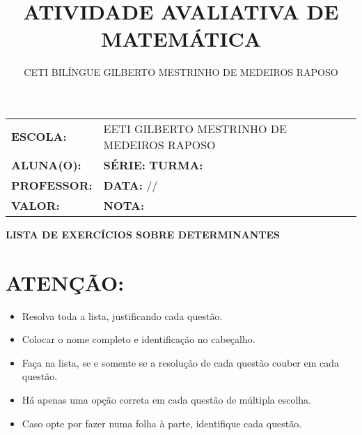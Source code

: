 \documentclass{article}
\title{ATIVIDADE AVALIATIVA DE MATEMÁTICA}
\author{CETI BILÍNGUE GILBERTO MESTRINHO DE MEDEIROS RAPOSO}
\date{}
\begin{document}
	\Large
	\vspace{1cm}
	\begin{center}
		\begin{tabular}{|l l|}
			\hline
			\textbf{ESCOLA:} & EETI GILBERTO MESTRINHO DE MEDEIROS RAPOSO \\
			\textbf{ALUNA(O):} & \underline{\hspace{8cm}} \textbf{SÉRIE:} \underline{\hspace{2cm}} \textbf{TURMA:} \underline{\hspace{2cm}} \\
			\textbf{PROFESSOR:} & \underline{\hspace{8cm}} \textbf{DATA:} \underline{\hspace{1.66cm}}/\underline{\hspace{2cm}}/\underline{\hspace{2cm}} \\
			\textbf{VALOR:} & \underline{\hspace{4cm}} \textbf{NOTA:} \underline{\hspace{2cm}} \\
			\hline
		\end{tabular}
	\end{center}
	\vspace{1cm}
	
	\begin{center}
		\Large\textbf{LISTA DE EXERCÍCIOS SOBRE DETERMINANTES}
	\end{center}
	
	\vspace{0.5cm}
	
	\section*{ATENÇÃO:}
	\begin{itemize}[noitemsep]
		\item Resolva toda a lista, justificando cada questão.
		\item Colocar o nome completo e identificação no cabeçalho.
		\item Faça na lista, se e somente se a resolução de cada questão couber em cada questão.
		\item Há apenas uma opção correta em cada questão de múltipla escolha.
		\item Caso opte por fazer numa folha à parte, identifique cada questão.
	\end{itemize}
	
\end{document}
